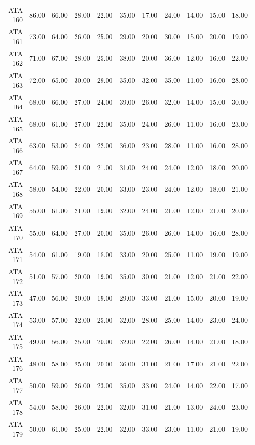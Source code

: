 \begin{landscape}
\begin{longtable}{rrrrrrrrrrr}
  ATA 160 & 86.00 & 66.00 & 28.00 & 22.00 & 35.00 & 17.00 & 24.00 & 14.00 & 15.00 & 18.00 \\ 
  ATA 161 & 73.00 & 64.00 & 26.00 & 25.00 & 29.00 & 20.00 & 30.00 & 15.00 & 20.00 & 19.00 \\ 
  ATA 162 & 71.00 & 67.00 & 28.00 & 25.00 & 38.00 & 20.00 & 36.00 & 12.00 & 16.00 & 22.00 \\ 
  ATA 163 & 72.00 & 65.00 & 30.00 & 29.00 & 35.00 & 32.00 & 35.00 & 11.00 & 16.00 & 28.00 \\ 
  ATA 164 & 68.00 & 66.00 & 27.00 & 24.00 & 39.00 & 26.00 & 32.00 & 14.00 & 15.00 & 30.00 \\ 
  ATA 165 & 68.00 & 61.00 & 27.00 & 22.00 & 35.00 & 24.00 & 26.00 & 11.00 & 16.00 & 23.00 \\ 
  ATA 166 & 63.00 & 53.00 & 24.00 & 22.00 & 36.00 & 23.00 & 28.00 & 11.00 & 16.00 & 28.00 \\ 
  ATA 167 & 64.00 & 59.00 & 21.00 & 21.00 & 31.00 & 24.00 & 24.00 & 12.00 & 18.00 & 20.00 \\ 
  ATA 168 & 58.00 & 54.00 & 22.00 & 20.00 & 33.00 & 23.00 & 24.00 & 12.00 & 18.00 & 21.00 \\ 
  ATA 169 & 55.00 & 61.00 & 21.00 & 19.00 & 32.00 & 24.00 & 21.00 & 12.00 & 21.00 & 20.00 \\ 
  ATA 170 & 55.00 & 64.00 & 27.00 & 20.00 & 35.00 & 26.00 & 26.00 & 14.00 & 16.00 & 28.00 \\ 
  ATA 171 & 54.00 & 61.00 & 19.00 & 18.00 & 33.00 & 20.00 & 25.00 & 11.00 & 19.00 & 19.00 \\ 
  ATA 172 & 51.00 & 57.00 & 20.00 & 19.00 & 35.00 & 30.00 & 21.00 & 12.00 & 21.00 & 22.00 \\ 
  ATA 173 & 47.00 & 56.00 & 20.00 & 19.00 & 29.00 & 33.00 & 21.00 & 15.00 & 20.00 & 19.00 \\ 
  ATA 174 & 53.00 & 57.00 & 32.00 & 25.00 & 32.00 & 28.00 & 25.00 & 14.00 & 23.00 & 24.00 \\ 
  ATA 175 & 49.00 & 56.00 & 25.00 & 20.00 & 32.00 & 22.00 & 26.00 & 14.00 & 21.00 & 18.00 \\ 
  ATA 176 & 48.00 & 58.00 & 25.00 & 20.00 & 36.00 & 31.00 & 21.00 & 17.00 & 21.00 & 22.00 \\ 
  ATA 177 & 50.00 & 59.00 & 26.00 & 23.00 & 35.00 & 33.00 & 24.00 & 14.00 & 22.00 & 17.00 \\ 
  ATA 178 & 54.00 & 58.00 & 26.00 & 22.00 & 32.00 & 31.00 & 21.00 & 13.00 & 24.00 & 23.00 \\ 
  ATA 179 & 50.00 & 61.00 & 25.00 & 22.00 & 32.00 & 33.00 & 23.00 & 11.00 & 21.00 & 19.00 \\ 

\end{longtable}
\end{landscape}
